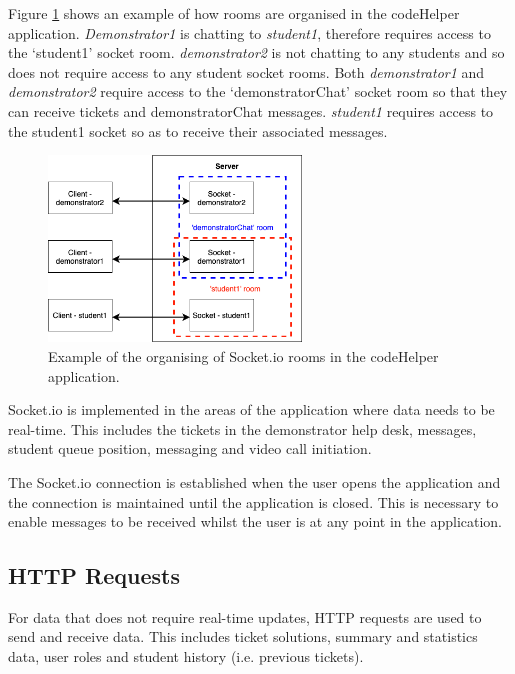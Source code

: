 Figure \ref{fig:socketiorooms} shows an example of how rooms are organised in the codeHelper application. \textit{Demonstrator1} is chatting to \textit{student1}, therefore requires access to the `student1' socket room. \textit{demonstrator2} is not chatting to any students and so does not require access to any student socket rooms. Both \textit{demonstrator1} and \textit{demonstrator2} require access to the `demonstratorChat' socket room so that they can receive tickets and demonstratorChat messages. \textit{student1} requires access to the student1 socket so as to receive their associated messages.

\begin{figure}[H]
    \centering
    \includegraphics[width=0.6\textwidth]{8implementation/images/socketRooms.png}
    \caption{Example of the organising of Socket.io rooms in the codeHelper application.}
    \label{fig:socketiorooms}
\end{figure}

Socket.io is implemented in the areas of the application where data needs to be real-time. This includes the tickets in the demonstrator help desk, messages, student queue position, messaging and video call initiation. 

The Socket.io connection is established when the user opens the application and the connection is maintained until the application is closed. This is necessary to enable messages to be received whilst the user is at any point in the application. 

\subsection{HTTP Requests}

For data that does not require real-time updates, HTTP requests are used to send and receive data. This includes ticket solutions, summary and statistics data, user roles and student history (i.e. previous tickets).

